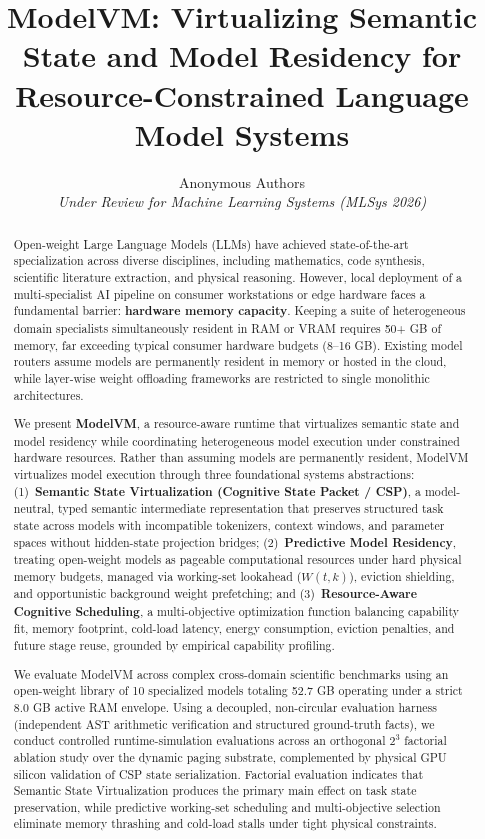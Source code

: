 \documentclass[10pt,twocolumn]{article}
\title{\textbf{ModelVM: Virtualizing Semantic State and Model Residency for Resource-Constrained Language Model Systems}}
\author{
  Anonymous Authors \\
  \textit{Under Review for Machine Learning Systems (MLSys 2026)}
}
\date{}
\begin{document}
\maketitle

\begin{abstract}
Open-weight Large Language Models (LLMs) have achieved state-of-the-art specialization across diverse disciplines, including mathematics, code synthesis, scientific literature extraction, and physical reasoning. However, local deployment of a multi-specialist AI pipeline on consumer workstations or edge hardware faces a fundamental barrier: \textbf{hardware memory capacity}. Keeping a suite of heterogeneous domain specialists simultaneously resident in RAM or VRAM requires 50+ GB of memory, far exceeding typical consumer hardware budgets (8--16 GB). Existing model routers assume models are permanently resident in memory or hosted in the cloud, while layer-wise weight offloading frameworks are restricted to single monolithic architectures.

We present \textbf{ModelVM}, a resource-aware runtime that virtualizes semantic state and model residency while coordinating heterogeneous model execution under constrained hardware resources. Rather than assuming models are permanently resident, ModelVM virtualizes model execution through three foundational systems abstractions: (1)~\textbf{Semantic State Virtualization (Cognitive State Packet / CSP)}, a model-neutral, typed semantic intermediate representation that preserves structured task state across models with incompatible tokenizers, context windows, and parameter spaces without hidden-state projection bridges; (2)~\textbf{Predictive Model Residency}, treating open-weight models as pageable computational resources under hard physical memory budgets, managed via working-set lookahead ($W(t, k)$), eviction shielding, and opportunistic background weight prefetching; and (3)~\textbf{Resource-Aware Cognitive Scheduling}, a multi-objective optimization function balancing capability fit, memory footprint, cold-load latency, energy consumption, eviction penalties, and future stage reuse, grounded by empirical capability profiling.

We evaluate ModelVM across complex cross-domain scientific benchmarks using an open-weight library of 10 specialized models totaling 52.7 GB operating under a strict 8.0 GB active RAM envelope. Using a decoupled, non-circular evaluation harness (independent AST arithmetic verification and structured ground-truth facts), we conduct controlled runtime-simulation evaluations across an orthogonal $2^3$ factorial ablation study over the dynamic paging substrate, complemented by physical GPU silicon validation of CSP state serialization. Factorial evaluation indicates that Semantic State Virtualization produces the primary main effect on task state preservation, while predictive working-set scheduling and multi-objective selection eliminate memory thrashing and cold-load stalls under tight physical constraints.
\end{abstract}
\end{document}
